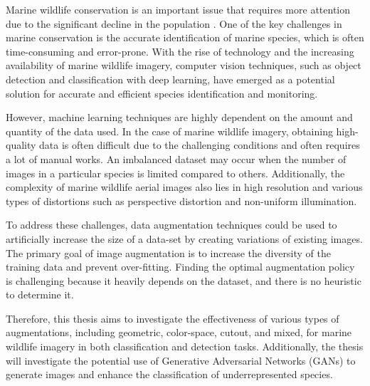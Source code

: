 
Marine wildlife conservation is an important issue that requires more attention due to the significant decline in the population \cite{nelms2021marine}. One of the key challenges in marine conservation is the accurate identification of marine species, which is often time-consuming and error-prone. With the rise of technology and the increasing availability of marine wildlife imagery, computer vision techniques, such as object detection and classification with deep learning, have emerged as a potential solution for accurate and efficient species identification and monitoring.

However, machine learning techniques are highly dependent on the amount and quantity of the data used. In the case of marine wildlife imagery, obtaining high-quality data is often difficult due to the challenging conditions and often requires a lot of manual works. An imbalanced dataset may occur when the number of images in a particular species is limited compared to others. Additionally, the complexity of marine wildlife aerial images also lies in high resolution and various types of distortions such as perspective distortion and non-uniform illumination. 

To address these challenges, data augmentation techniques could be used to artificially increase the size of a data-set by creating variations of existing images. The primary goal of image augmentation is to increase the diversity of the training data and prevent over-fitting. Finding the optimal augmentation policy is challenging because it heavily depends on the dataset, and there is no heuristic to determine it. 

Therefore, this thesis aims to investigate the effectiveness of various types of augmentations, including geometric, color-space, cutout, and mixed, for marine wildlife imagery in both classification and detection tasks. Additionally, the thesis will investigate the potential use of Generative Adversarial Networks (GANs) to generate images and enhance the classification of underrepresented species.



